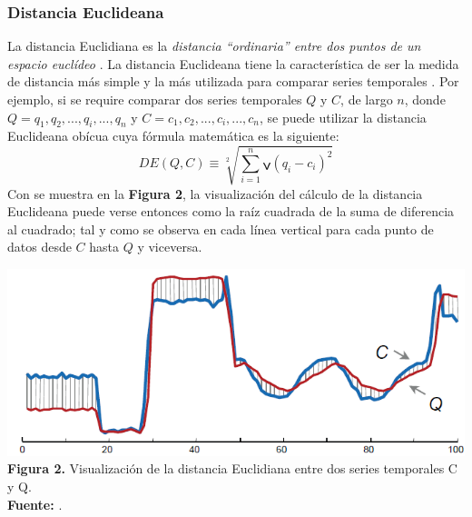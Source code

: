 \subsubsection{\textbf{Distancia Euclideana}}
La distancia Euclidiana es la \textit{distancia \enquote{ordinaria} entre dos puntos de un espacio eucl\'ideo} \cite{euclidean}. 
La distancia Euclideana tiene la caracter\'istica de ser la medida de distancia m\'as simple y la m\'as utilizada para comparar series temporales \cite{motifs}. Por ejemplo, si se require comparar dos series temporales $Q$ y $C$, de largo $n$, donde $Q = q_1, q_2, ..., q_i, ..., q_n$ y $C = c_1, c_2, ..., c_i, ..., c_n$, se puede utilizar la distancia Euclideana ob\'icua cuya f\'ormula matem\'atica es la siguiente: 
\begin{equation}
DE(Q, C) \equiv \sqrt[2]{\sum\limits_{i=1}^{n}ݍ{(q_i - c_i)}^2}
\end{equation}
Con se muestra en la \textbf{Figura 2}, la visualizaci\'on del c\'alculo de la distancia Euclideana puede verse entonces como la ra\'iz cuadrada de la suma de diferencia al cuadrado; tal y como se observa en cada l\'inea vertical para cada punto de datos desde $C$ hasta $Q$ y viceversa.
\begin{center}
\includegraphics[scale=0.7]{euclidean.png}\\
\vspace*{10pt}
\footnotesize{\textbf{Figura 2.} Visualizaci\'on de la distancia Euclidiana entre dos series temporales C y Q.}\\ \textbf{Fuente:} \cite{euclidean}.
\end{center}
